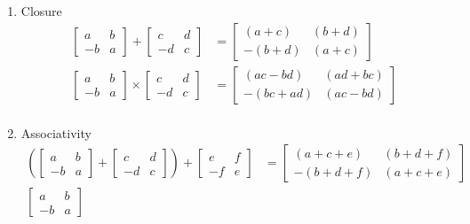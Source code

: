 \documentclass[letterpaper]{article}
\begin{document}
\begin{enumerate}
\begin{enumerate}
    \renewcommand{\labelenumiii}{(\roman{enumiii})}
    \begin{enumerate}
    \item
      Closure
      \begin{align*}
        \left[\begin{array}{rr}a&b\\-b&a\end{array}\right]
        +\left[\begin{array}{rr}c&d\\-d&c\end{array}\right]
        &=\left[\begin{array}{rr}(a+c)&(b+d)\\-(b+d)&(a+c)\end{array}\right]\\
        \left[\begin{array}{rr}a&b\\-b&a\end{array}\right]
        \times \left[\begin{array}{rr}c&d\\-d&c\end{array}\right]
        &=\left[\begin{array}{rr}(ac-bd)&(ad+bc)\\-(bc+ad)&(ac-bd)\end{array}\right]\\
      \end{align*}
    \item
      Associativity
      \begin{align*}
        \left(\left[\begin{array}{rr}a&b\\-b&a\end{array}\right]
        +\left[\begin{array}{rr}c&d\\-d&c\end{array}\right]\right)
        +\left[\begin{array}{rr}e&f\\-f&e\end{array}\right]
        &=\left[\begin{array}{rr}(a+c+e)&(b+d+f)\\-(b+d+f)&(a+c+e)\end{array}\right]\\
        \left[\begin{array}{rr}a&b\\-b&a\end{array}\right]

\end{align*}
\end{enumerate}
\end{enumerate}
\end{enumerate}
\end{document}
